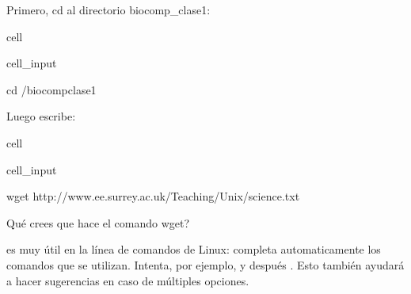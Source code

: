 \documentclass[letterpaper,10pt,english]{jupyterBook}
\begin{document}
\sphinxAtStartPar
Primero, cd al directorio biocomp\_clase1:

\begin{sphinxuseclass}{cell}\begin{sphinxVerbatimInput}

\begin{sphinxuseclass}{cell_input}
\begin{sphinxVerbatim}[commandchars=\\\{\}]
\PYGZdl{} cd \PYGZti{}/biocomp\PYGZus{}clase1
\end{sphinxVerbatim}

\end{sphinxuseclass}\end{sphinxVerbatimInput}

\end{sphinxuseclass}
\sphinxAtStartPar
Luego escribe:

\begin{sphinxuseclass}{cell}\begin{sphinxVerbatimInput}

\begin{sphinxuseclass}{cell_input}
\begin{sphinxVerbatim}[commandchars=\\\{\}]
\PYGZdl{} wget http://www.ee.surrey.ac.uk/Teaching/Unix/science.txt
\end{sphinxVerbatim}

\end{sphinxuseclass}\end{sphinxVerbatimInput}

\end{sphinxuseclass}
\sphinxAtStartPar
Qué crees que hace el comando wget?



\begin{DUlineblock}{0em}
\item[] 
\end{DUlineblock}

\sphinxAtStartPar
\sphinxcode{\sphinxupquote{{[}TAB{]}}} es muy útil en la línea de comandos de Linux: completa automaticamente los comandos que se utilizan. Intenta, por ejemplo,  y después . Esto también ayudará a hacer sugerencias en caso de múltiples opciones.

\begin{DUlineblock}{0em}
\item[] 
\end{DUlineblock}
\end{document}
